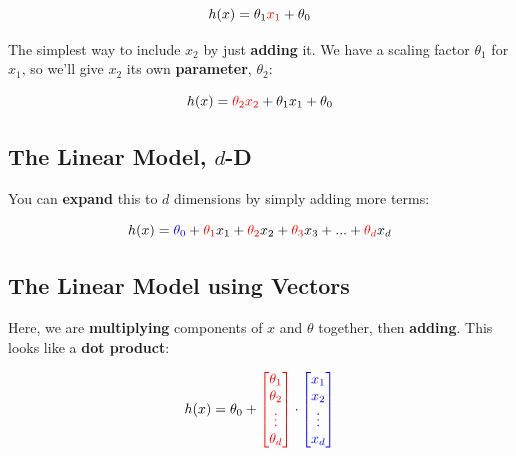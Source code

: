         \begin{equation}
            h(x) = \theta_1 \textcolor{red}{x_1} + \theta_0
        \end{equation}
        
        The simplest way to include $x_2$ by just \textbf{adding} it. We have a scaling factor $\theta_1$ for $x_1$, so we'll give $x_2$ its own \textbf{parameter}, $\theta_2$:
        
        \begin{equation}
            h(x) = \textcolor{red}{\theta_2 x_2} + \theta_1 x_1 + \theta_0
        \end{equation}
        
    \subsection{The Linear Model, $d$-D}
    
        You can \textbf{expand} this to $d$ dimensions by simply adding more terms:
        
        \begin{equation}
            h(x) = \textcolor{blue}{\theta_0} + \textcolor{red}{\theta_1}x_1 + \textcolor{red}{\theta_2}x_2 + \textcolor{red}{\theta_3}x_3 + ... + \textcolor{red}{\theta_d}x_d
        \end{equation}
        
    \subsection{The Linear Model using Vectors}
        
        Here, we are \textbf{multiplying} components of $x$ and $\theta$ together, then \textbf{adding}. This looks like a \textbf{dot product}:
        
        \begin{equation}
            h(x) = \theta_0 +
            \textcolor{red}{
                \begin{bmatrix}
                    \theta_1 \\ \theta_2 \\ \vdots \\ \theta_d
                \end{bmatrix}
                }
                \cdot
                \textcolor{blue}{
                \begin{bmatrix}
                    x_1 \\ x_2 \\ \vdots \\ x_d
                \end{bmatrix}
            }
        \end{equation}
        
